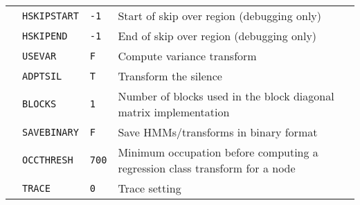 \begin{center}
\begin{supertabular}{|p{1.4cm}|l|l|p{6.6cm}|}
 & \texttt{HSKIPSTART} & \texttt{-1} & Start of skip over region (debugging only) \\ 
  & \texttt{HSKIPEND} & \texttt{-1} & End of skip over region (debugging only) \\ \hline

  & \texttt{USEVAR} & \texttt{F} & Compute variance transform \\ 
  & \texttt{ADPTSIL} & \texttt{T} & Transform the silence\\ 
  & \texttt{BLOCKS} & \texttt{1} & Number of blocks used in the block diagonal matrix implementation \\ 
  & \texttt{SAVEBINARY} & \texttt{F} & Save HMMs/transforms in binary format \\ 
  & \texttt{OCCTHRESH} & \texttt{700} & Minimum occupation before computing a regression class transform for a node\\ \hline

  & \texttt{TRACE} & \texttt{0} & Trace setting\\ \hline


\end{supertabular}
\end{center}
